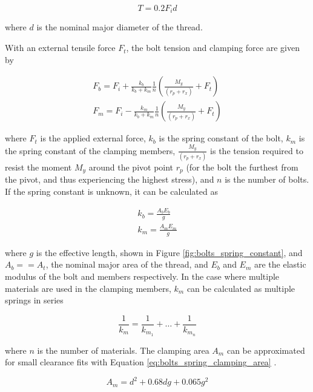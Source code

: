 \begin{equation}
    T = 0.2 F_i d
\end{equation}{}

where $d$ is the nominal major diameter of the thread.

With an external tensile force $F_t$, the bolt tension and clamping force are given by

\begin{gather}
    F_b = F_i + \frac{k_b}{k_b + k_m} \frac{1}{n} \left(\frac{M_y}{(r_p + r_x)} + F_t\right) \label{eq:bolts_tension_force}
    \\
    F_m = F_i - \frac{k_m}{k_b + k_m} \frac{1}{n} \left(\frac{M_y}{(r_p + r_x)} + F_t\right)
\end{gather}{}

where $F_t$ is the applied external force, $k_b$ is the spring constant of the bolt,  $k_m$ is the spring constant of the clamping members,  $\frac{M_y}{(r_p + r_x)}$ is the tension required to resist the moment $M_y$ around the pivot point $r_p$ (for the bolt the furthest from the pivot, and thus experiencing the highest stress), and $n$ is the number of bolts.
If the spring constant is unknown, it can be calculated as

\begin{gather}
    k_b = \frac{A_b E_b}{g}
    \\
    k_m = \frac{A_m E_m}{g}
\end{gather}{}

where $g$ is the effective length, shown in Figure \ref{fig:bolts_spring_constant}, and $A_b == A_t$, the nominal major area of the thread, and $E_b$ and $E_m$  are the elastic modulus of the bolt and members respectively.
In the case where multiple materials are used in the clamping members, $k_m$ can be calculated as multiple springs in series

\begin{equation}
    \frac{1}{k_m} = \frac{1}{k_{m_1}} + \dots + \frac{1}{k_{m_n}}
\end{equation}{}

where $n$ is the number of materials.
The clamping area $A_m$ can be approximated for small clearance fits with Equation \ref{eq:bolts_spring_clamping_area} \cite{juvinall_fundamentals_2012}.

\begin{equation} \label{eq:bolts_spring_clamping_area}
    A_m = d^2 + 0.68 d g + 0.065 g^2
\end{equation}{}

